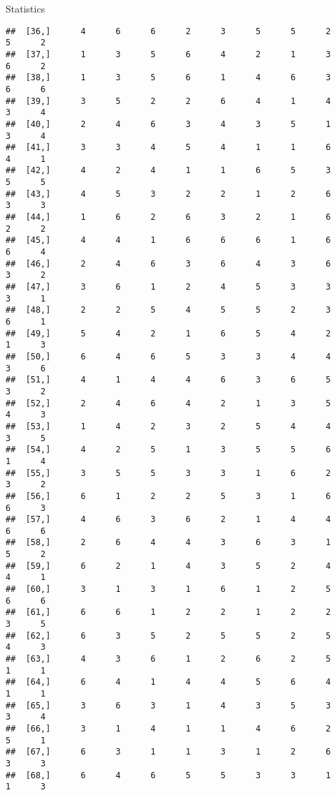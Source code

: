 \documentclass[
  ignorenonframetext,
]{beamer}
\begin{document}
\begin{frame}[fragile]{Statistics}
\begin{verbatim}
##  [36,]      4      6      6      2      3      5      5      2      5      2
##  [37,]      1      3      5      6      4      2      1      3      6      2
##  [38,]      1      3      5      6      1      4      6      3      6      6
##  [39,]      3      5      2      2      6      4      1      4      3      4
##  [40,]      2      4      6      3      4      3      5      1      3      4
##  [41,]      3      3      4      5      4      1      1      6      4      1
##  [42,]      4      2      4      1      1      6      5      3      5      5
##  [43,]      4      5      3      2      2      1      2      6      3      3
##  [44,]      1      6      2      6      3      2      1      6      2      2
##  [45,]      4      4      1      6      6      6      1      6      6      4
##  [46,]      2      4      6      3      6      4      3      6      3      2
##  [47,]      3      6      1      2      4      5      3      3      3      1
##  [48,]      2      2      5      4      5      5      2      3      6      1
##  [49,]      5      4      2      1      6      5      4      2      1      3
##  [50,]      6      4      6      5      3      3      4      4      3      6
##  [51,]      4      1      4      4      6      3      6      5      3      2
##  [52,]      2      4      6      4      2      1      3      5      4      3
##  [53,]      1      4      2      3      2      5      4      4      3      5
##  [54,]      4      2      5      1      3      5      5      6      1      4
##  [55,]      3      5      5      3      3      1      6      2      3      2
##  [56,]      6      1      2      2      5      3      1      6      6      3
##  [57,]      4      6      3      6      2      1      4      4      6      6
##  [58,]      2      6      4      4      3      6      3      1      5      2
##  [59,]      6      2      1      4      3      5      2      4      4      1
##  [60,]      3      1      3      1      6      1      2      5      6      6
##  [61,]      6      6      1      2      2      1      2      2      3      5
##  [62,]      6      3      5      2      5      5      2      5      4      3
##  [63,]      4      3      6      1      2      6      2      5      1      1
##  [64,]      6      4      1      4      4      5      6      4      1      1
##  [65,]      3      6      3      1      4      3      5      3      3      4
##  [66,]      3      1      4      1      1      4      6      2      5      1
##  [67,]      6      3      1      1      3      1      2      6      3      3
##  [68,]      6      4      6      5      5      3      3      1      1      3

\end{verbatim}
\end{frame}
\end{document}
